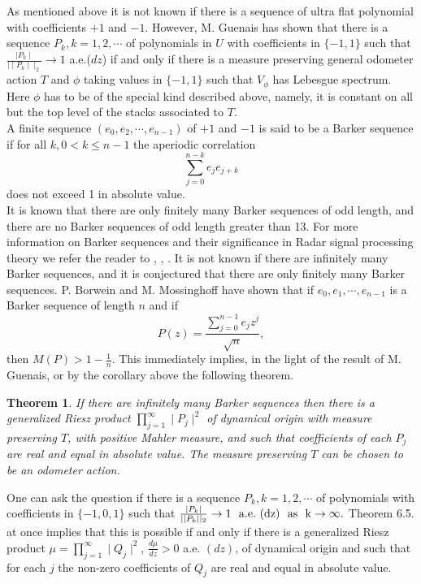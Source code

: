 \documentclass{amsart}
\newtheorem{Th}{Theorem}[section]
\theoremstyle{definition}
\theoremstyle{remark}
\numberwithin{equation}{section}
\newcommand{\1}{\mathbb{1}}
\begin{document}
 As mentioned above it is not known if there is a sequence of ultra flat polynomial with coefficients $+1$ and $-1$. However, M. Guenais\cite{Guenais} has shown that there is a sequence $P_k, k=1,2,\cdots$ of polynomials in $U$ with coefficients in $\{-1,1\}$ such that $\frac{\mid P_k\mid}{\mid\mid P_k\mid\mid_2}\rightarrow 1$ a.e.($dz$) if and only if there is a measure preserving general odometer action $T$  and $\phi$ taking values in $\{-1,1\}$ such that $V_\phi$ has Lebesgue spectrum. Here $\phi$ has to be of the special kind described above, namely, it is constant on all but the top level of the stacks associated to $T$.\\

A finite sequence $(e_0, e_2, \cdots, e_{n-1})$ of $+1$ and $-1$ is said to be a Barker
sequence if for all $k, 0 < k \leq  n-1 $  the aperiodic correlation
$$ \sum_{j=0}^{n-k}e_je_{j+k}$$
does not exceed 1 in absolute value.\\

It is known that there are only finitely many Barker sequences of odd length, and there are
no Barker sequences of odd length greater than 13. For more information on Barker sequences
and their significance in Radar signal processing theory we refer the reader to \cite{down}, \cite{bor}, \cite{bor1}. It is not known if there are infinitely many Barker sequences, and it is conjectured that there are only finitely many Barker sequences. P. Borwein and M. Mossinghoff\cite{bor}  have shown that if $e_0, e_1, \cdots, e_{n-1}$ is a Barker sequence of length $n$ and if
$$P(z) = \frac{\sum_{j=0}^{n-1}e_jz^j}{\sqrt n},$$ then
$M(P) > 1-\frac{1}{n}$. This immediately implies, in the light of the result of M. Guenais, or by the corollary above the following theorem.
\begin{Th}\label{th7}
 If there are infinitely many Barker sequences then there is a generalized
Riesz product $ \prod_{j=1}^\infty \mid P_j\mid^2$  of dynamical origin with measure preserving $T$, with positive Mahler measure, and such that coefficients of each $P_j$ are real and equal in absolute value. The measure preserving $T$ can be chosen to be an odometer action.
\end{Th}

One can ask the question if there is a sequence $P_k, k=1,2,\cdots$ of polynomials with coefficients in $\{-1, 0, 1\}$ such that
 $\frac{\mid P_k\mid}{\mid \mid P_k\mid\mid_2}\rightarrow 1~~\rm{a.e.}~(dz) ~~{\rm{as}} ~~k\rightarrow \infty.$ Theorem 6.5. at once implies that this is possible if and only if  there is a generalized Riesz  product $\mu = \prod_{j=1}^\infty\mid Q_j\mid^2$, $\frac{d\mu}{dz} > 0$ a.e. $(dz)$,  of dynamical origin and such that for each $j$ the non-zero coefficients of $Q_j$ are real and equal in absolute value.\\
\end{document}
